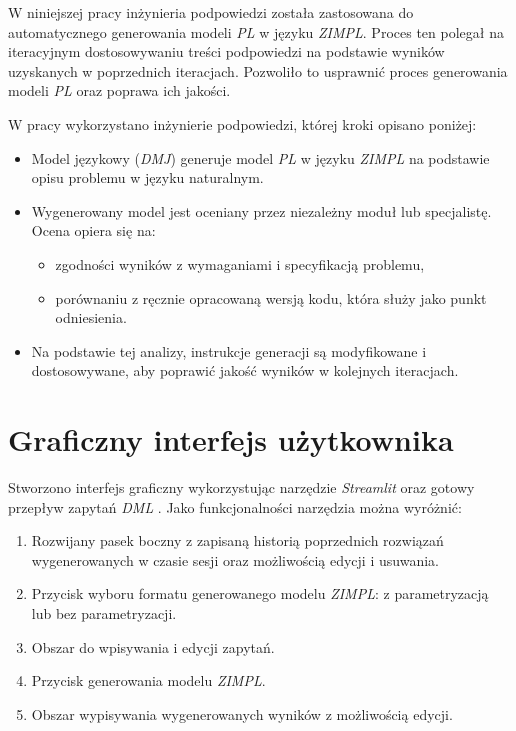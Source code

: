 W niniejszej pracy inżynieria podpowiedzi została zastosowana do automatycznego generowania modeli \textit{PL} w języku \textit{ZIMPL}. Proces ten polegał na iteracyjnym dostosowywaniu treści podpowiedzi na podstawie wyników uzyskanych w poprzednich iteracjach. Pozwoliło to usprawnić proces generowania modeli \textit{PL} oraz poprawa ich jakości.

W pracy wykorzystano inżynierie podpowiedzi, której kroki opisano poniżej:
\begin{itemize} 
\item Model językowy (\textit{DMJ}) generuje model \textit{PL} w języku \textit{ZIMPL} na podstawie opisu problemu w języku naturalnym. 
\item Wygenerowany model jest oceniany przez niezależny moduł lub specjalistę. Ocena opiera się na: 
    \begin{itemize} 
        \item zgodności wyników z wymaganiami i specyfikacją problemu, 
        \item porównaniu z ręcznie opracowaną wersją kodu, która służy jako punkt odniesienia. 
    \end{itemize} 
\item Na podstawie tej analizy, instrukcje generacji są modyfikowane i dostosowywane, aby poprawić jakość wyników w kolejnych iteracjach.\end{itemize}


\section{Graficzny interfejs użytkownika}\label{sec:generation:gui}

Stworzono interfejs graficzny wykorzystując narzędzie \textit{Streamlit} \cite{TODO} oraz gotowy przepływ zapytań \textit{DML} \cite{TODO}. Jako funkcjonalności narzędzia można wyróżnić:

\begin{enumerate}
\item Rozwijany pasek boczny z zapisaną historią poprzednich rozwiązań wygenerowanych w czasie sesji oraz możliwością edycji i usuwania.
\item Przycisk wyboru formatu generowanego modelu \textit{ZIMPL}: z parametryzacją lub bez parametryzacji.
\item Obszar do wpisywania i edycji zapytań.
\item Przycisk generowania modelu \textit{ZIMPL}.
\item Obszar wypisywania wygenerowanych wyników z możliwością edycji.
\end{enumerate}

